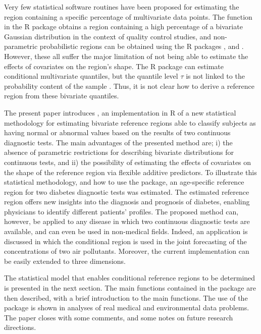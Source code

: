 Very few statistical software routines have been proposed for estimating the region containing a specific percentage of multivariate data points. The function  in the R package  \citep{young2010tolerance} obtains a region containing a high percentage of a bivariate Gaussian distribution in the context of quality control studies, and non-parametric probabilistic regions can be obtained using the R packages  \citep{r2d2},  \citep{hdrcde} and   \citep{distfree}. However, these all suffer the major limitation of not being able to estimate the effects of covariates on the region’s shape. The R package  can estimate conditional multivariate quantiles, but the quantile level $\tau$ is not linked to the probability content of the sample \citep{siman}. Thus, it is not clear how to derive a reference region from these bivariate quantiles.

The present paper introduces , an implementation in R of a new statistical methodology for estimating bivariate reference regions able to classify subjects as having normal or abnormal values based on the results of two continuous diagnostic tests. The main advantages of the presented method are; i) the absence of parametric restrictions for describing bivariate distributions for continuous tests, and ii) the possibility of estimating the effects of covariates on the shape of the reference region via flexible additive predictors. To illustrate this statistical methodology, and how to use the package, an age-specific reference region for two diabetes diagnostic tests was estimated. The estimated reference region offers new insights into the diagnosis and prognosis of diabetes, enabling physicians to identify different patients’ profiles. The proposed method can, however, be applied to any disease in which two continuous diagnostic tests are available, and can even be used in non-medical fields. Indeed, an application is discussed in which the conditional region is used in the joint forecasting of the concentrations of two air pollutants. Moreover, the current implementation can be easily extended to three dimensions.

The statistical model that enables conditional reference regions to be determined is presented in the next section. The main functions contained in the  package are then described, with a brief introduction to the main functions. The use of the package is shown in analyses of real medical and environmental data problems. The paper closes with some comments, and some notes on future research directions.

